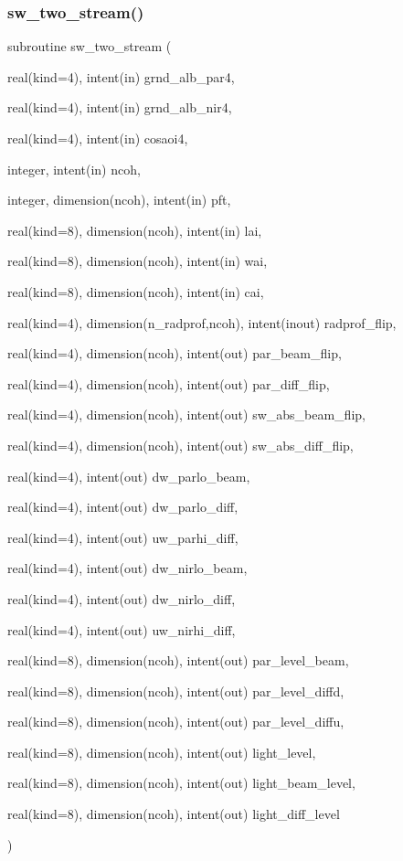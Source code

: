 \subsubsection{\texorpdfstring{sw\+\_\+two\+\_\+stream()}{sw\_two\_stream()}}
{\footnotesize\ttfamily subroutine sw\+\_\+two\+\_\+stream (\begin{DoxyParamCaption}\item[{real(kind=4), intent(in)}]{grnd\+\_\+alb\+\_\+par4,  }\item[{real(kind=4), intent(in)}]{grnd\+\_\+alb\+\_\+nir4,  }\item[{real(kind=4), intent(in)}]{cosaoi4,  }\item[{integer, intent(in)}]{ncoh,  }\item[{integer, dimension(ncoh), intent(in)}]{pft,  }\item[{real(kind=8), dimension(ncoh), intent(in)}]{lai,  }\item[{real(kind=8), dimension(ncoh), intent(in)}]{wai,  }\item[{real(kind=8), dimension(ncoh), intent(in)}]{cai,  }\item[{real(kind=4), dimension(n\+\_\+radprof,ncoh), intent(inout)}]{radprof\+\_\+flip,  }\item[{real(kind=4), dimension(ncoh), intent(out)}]{par\+\_\+beam\+\_\+flip,  }\item[{real(kind=4), dimension(ncoh), intent(out)}]{par\+\_\+diff\+\_\+flip,  }\item[{real(kind=4), dimension(ncoh), intent(out)}]{sw\+\_\+abs\+\_\+beam\+\_\+flip,  }\item[{real(kind=4), dimension(ncoh), intent(out)}]{sw\+\_\+abs\+\_\+diff\+\_\+flip,  }\item[{real(kind=4), intent(out)}]{dw\+\_\+parlo\+\_\+beam,  }\item[{real(kind=4), intent(out)}]{dw\+\_\+parlo\+\_\+diff,  }\item[{real(kind=4), intent(out)}]{uw\+\_\+parhi\+\_\+diff,  }\item[{real(kind=4), intent(out)}]{dw\+\_\+nirlo\+\_\+beam,  }\item[{real(kind=4), intent(out)}]{dw\+\_\+nirlo\+\_\+diff,  }\item[{real(kind=4), intent(out)}]{uw\+\_\+nirhi\+\_\+diff,  }\item[{real(kind=8), dimension(ncoh), intent(out)}]{par\+\_\+level\+\_\+beam,  }\item[{real(kind=8), dimension(ncoh), intent(out)}]{par\+\_\+level\+\_\+diffd,  }\item[{real(kind=8), dimension(ncoh), intent(out)}]{par\+\_\+level\+\_\+diffu,  }\item[{real(kind=8), dimension(ncoh), intent(out)}]{light\+\_\+level,  }\item[{real(kind=8), dimension(ncoh), intent(out)}]{light\+\_\+beam\+\_\+level,  }\item[{real(kind=8), dimension(ncoh), intent(out)}]{light\+\_\+diff\+\_\+level }\end{DoxyParamCaption})}

